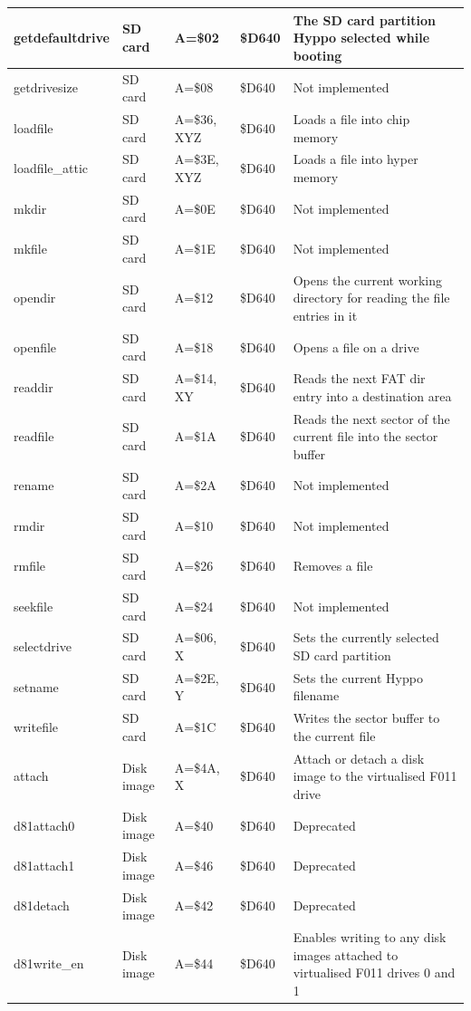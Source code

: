 \begin{longtable}{|L{4cm}|p{1.5cm}|L{1.5cm}|L{1.5cm}|L{4cm}|}
\hline
getdefaultdrive & SD card & A=\$02 & \$D640 & The SD card partition Hyppo selected while booting \\
\hline
getdrivesize & SD card & A=\$08 & \$D640 & Not implemented \\
\hline
loadfile & SD card & A=\$36, XYZ & \$D640 & Loads a file into chip memory \\
\hline
loadfile\_attic & SD card & A=\$3E, XYZ & \$D640 & Loads a file into hyper memory \\
\hline
mkdir & SD card & A=\$0E & \$D640 & Not implemented \\
\hline
mkfile & SD card & A=\$1E & \$D640 & Not implemented \\
\hline
opendir & SD card & A=\$12 & \$D640 & Opens the current working directory for reading the file entries in it \\
\hline
openfile & SD card & A=\$18 & \$D640 & Opens a file on a drive \\
\hline
readdir & SD card & A=\$14, XY & \$D640 & Reads the next FAT dir entry into a destination area \\
\hline
readfile & SD card & A=\$1A & \$D640 & Reads the next sector of the current file into the sector buffer \\
\hline
rename & SD card & A=\$2A & \$D640 & Not implemented \\
\hline
rmdir & SD card & A=\$10 & \$D640 & Not implemented \\
\hline
rmfile & SD card & A=\$26 & \$D640 & Removes a file \\
\hline
seekfile & SD card & A=\$24 & \$D640 & Not implemented \\
\hline
selectdrive & SD card & A=\$06, X & \$D640 & Sets the currently selected SD card partition \\
\hline
setname & SD card & A=\$2E, Y & \$D640 & Sets the current Hyppo filename \\
\hline
writefile & SD card & A=\$1C & \$D640 & Writes the sector buffer to the current file \\
\hline
attach & Disk image & A=\$4A, X & \$D640 & Attach or detach a disk image to the virtualised F011 drive \\
\hline
d81attach0 & Disk image & A=\$40 & \$D640 & Deprecated \\
\hline
d81attach1 & Disk image & A=\$46 & \$D640 & Deprecated \\
\hline
d81detach & Disk image & A=\$42 & \$D640 & Deprecated \\
\hline
d81write\_en & Disk image & A=\$44 & \$D640 & Enables writing to any disk images attached to virtualised F011 drives 0 and 1 \\

\end{longtable}
